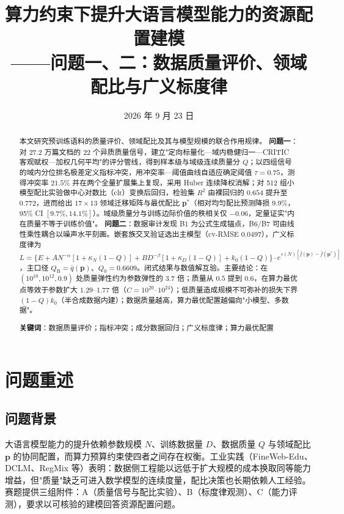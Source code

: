 \documentclass[11pt]{article}
\title{\textbf{算力约束下提升大语言模型能力的资源配置建模\\[4pt]
\large ——问题一、二：数据质量评价、领域配比与广义标度律}}
\author{}
\date{2026 年 9 月 23 日}
\begin{document}
\maketitle

\begin{abstract}
\noindent 本文研究预训练语料的质量评价、领域配比及其与模型规模的联合作用规律。
\textbf{问题一}：对 27.2 万篇文档的 22 个异质质量信号，建立"定向标量化—域内稳健归一—CRITIC 客观赋权—加权几何平均"的评分管线，得到样本级与域级连续质量分 $Q$；以四组信号的域内分位排名极差定义指标冲突，用冲突率—阈值曲线自适应确定阈值 $\tau=0.75$，测得冲突率 $21.5\%$ 并在两个全量扩展集上复现，采用 Huber 连续降权消解；对 512 组小模型配比实验做中心对数比（clr）变换后回归，检验集 $R^2$ 由裸回归的 $0.654$ 提升至 $0.772$，进而给出 $17\times13$ 领域迁移矩阵与最优配比 $\bm p^*$（相对均匀配比预测降损 $9.9\%$，95\% CI $[9.7\%,14.1\%]$）。域级质量分与训练边际价值的秩相关仅 $-0.06$，定量证实"内在质量不等于训练价值"。
\textbf{问题二}：数据审计发现 B1 为公式生成锚点，B6/B7 可由线性乘性耦合以噪声水平刻画。嵌套族交叉验证选出主模型（cv-RMSE $0.0497$），广义标度律为 $L=\{E+AN^{-\alpha}[1+\kappa_N(1-Q)]+BD^{-\beta}[1+\kappa_D(1-Q)]+k_0(1-Q)\}\cdot e^{s(N)[\bar f(\bm p)-\bar f(\bm p^*)]}$，主口径 $Q_{\mathrm B}=\bar q(\bm p)$、$Q_0=0.6609$。闭式结果与数值解互验。主要结论：在 $(10^{10},10^{12},0.9)$ 处质量弹性约为参数弹性的 $3.7$ 倍；质量从 $0.5$ 提到 $0.6$，在算力最优点等效于参数扩大 $1.29$--$1.77$ 倍（$C=10^{20}$--$10^{24}$）；低质量造成规模不可弥补的损失下界 $(1-Q)k_0$（半合成数据内建）；数据质量越高，算力最优配置越偏向"小模型、多数据"。

\vspace{4pt}
\noindent\textbf{关键词}：数据质量评价；指标冲突；成分数据回归；广义标度律；算力最优配置
\end{abstract}

\section{问题重述}

\subsection{问题背景}

大语言模型能力的提升依赖参数规模 $N$、训练数据量 $D$、数据质量 $Q$ 与领域配比 $\bm p$ 的协同配置，而算力预算约束使四者之间存在权衡。工业实践（FineWeb-Edu、DCLM、RegMix 等）表明：数据侧工程能以远低于扩大规模的成本换取同等能力增益，但"质量"缺乏可进入数学模型的连续度量，配比决策也长期依赖人工经验。赛题提供三组附件：A（质量信号与配比实验）、B（标度律观测）、C（能力评测），要求以可核验的建模回答资源配置问题。
\end{document}
